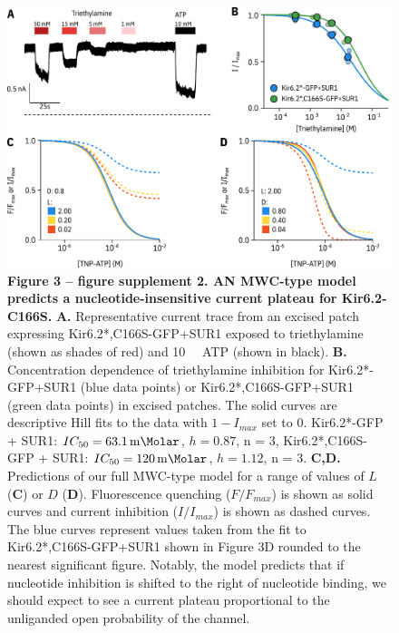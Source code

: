 \documentclass[10pt,lineno, doublespacing]{elife}
\begin{document}
\begin{figure}
\begin{fullwidth}
\centering
\includegraphics[width=\textwidth]{figure_three_s2}
\captionsetup{labelformat=empty}
\caption{
\textbf{Figure 3 -- figure supplement 2. AN MWC-type model predicts a nucleotide-insensitive current plateau for Kir6.2-C166S.}
\textbf{A.}
Representative current trace from an excised patch expressing Kir6.2*,C166S-GFP+SUR1 exposed to triethylamine (shown as shades of red) and \SI{10}{\milli\Molar} ATP (shown in black).
\textbf{B.}
Concentration dependence of triethylamine inhibition for Kir6.2*-GFP+SUR1 (blue data points) or Kir6.2*,C166S-GFP+SUR1 (green data points) in excised patches.
The solid curves are descriptive Hill fits to the data with $1 - I_{max}$ set to 0.
Kir6.2*-GFP + SUR1: $IC_{50} = \SI{63.1}{\milli\Molar}$, $h = 0.87$, n = 3, Kir6.2*,C166S-GFP + SUR1: $IC_{50} = \SI{120}{\milli\Molar}$, $h = 1.12$, n = 3.
\textbf{C,D.}
Predictions of our full MWC-type model for a range of values of $L$ (\textbf{C}) or $D$ (\textbf{D}).
Fluorescence quenching ($F/F_{max}$) is shown as solid curves and current inhibition ($I/I_{max}$) is shown as dashed curves.
The blue curves represent values taken from the fit to Kir6.2*,C166S-GFP+SUR1 shown in Figure 3D rounded to the nearest significant figure.
Notably, the model predicts that if nucleotide inhibition is shifted to the right of nucleotide binding, we should expect to see a current plateau proportional to the unliganded open probability of the channel.
}
\label{fig:three_s2}
\end{fullwidth}
\end{figure}
\end{document}
